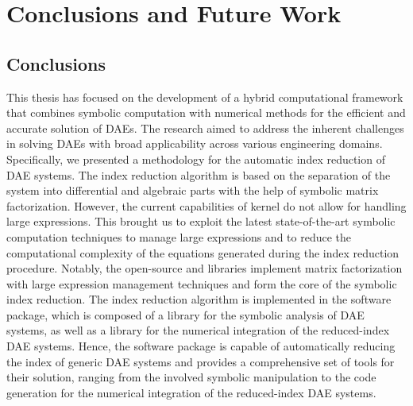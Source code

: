 
\chapter{Conclusions and Future Work}
\label{chap6:conclusions}

\section{Conclusions}

This thesis has focused on the development of a hybrid computational framework that combines symbolic computation with numerical methods for the efficient and accurate solution of \acp{DAE}. The research aimed to address the inherent challenges in solving \acp{DAE} with broad applicability across various engineering domains. Specifically, we presented a methodology for the automatic index reduction of \ac{DAE} systems. The index reduction algorithm is based on the separation of the system into differential and algebraic parts with the help of symbolic matrix factorization. However, the current capabilities of \Maple{} kernel do not allow for handling large expressions. This brought us to exploit the latest state-of-the-art symbolic computation techniques to manage large expressions and to reduce the computational complexity of the equations generated during the index reduction procedure. Notably, the open-source \LEM{} and \LAST{} libraries implement matrix factorization with large expression management techniques and form the core of the symbolic index reduction. The index reduction algorithm is implemented in the \Indigo{} software package, which is composed of a \Maple{} library for the symbolic analysis of \ac{DAE} systems, as well as a \Matlab{} library for the numerical integration of the reduced-index \ac{DAE} systems. Hence, the \Indigo{} software package is capable of automatically reducing the index of generic \ac{DAE} systems and provides a comprehensive set of tools for their solution, ranging from the involved symbolic manipulation to the \Matlab{} code generation for the numerical integration of the reduced-index \ac{DAE} systems.


